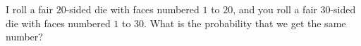 I roll a fair $20$-sided die with faces numbered $1$ to $20$, and you roll a fair $30$-sided die with faces numbered $1$ to $30$. What is the probability that we get the same number?
